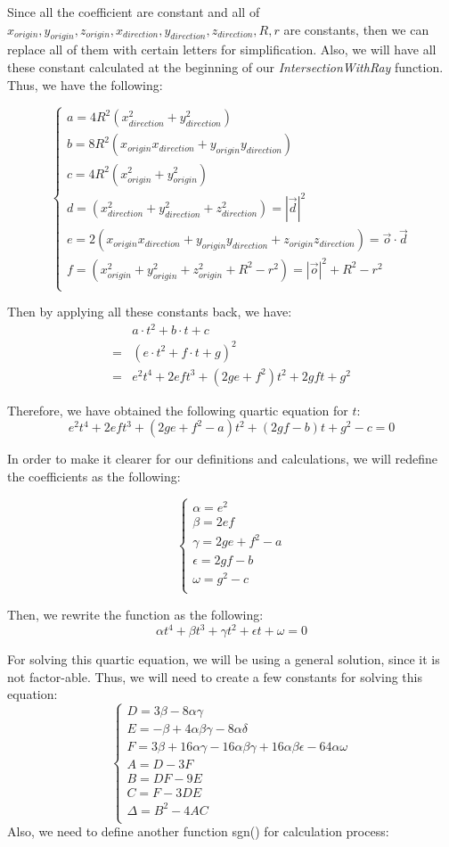 \documentclass[a4paper,12pt]{report}
\begin{document}
Since all the coefficient are constant and all of $x_{origin},y_{origin},z_{origin},x_{direction},y_{direction},z_{direction},R,r$ are constants, then we can replace all of them with certain letters for simplification. Also, we will have all these constant calculated at the beginning of our \textit{IntersectionWithRay} function. Thus, we have the following:

\[\begin{cases}
a=4R^2(x_{direction}^2+y_{direction}^2)\\
b=8R^2(x_{origin}x_{direction}+y_{origin}y_{direction})\\
c=4R^2(x_{origin}^2+y_{origin}^2)\\
d=(x_{direction}^2+y_{direction}^2+z_{direction}^2)=|\overrightarrow{d}|^2\\
e=2(x_{origin}x_{direction}+y_{origin}y_{direction}+z_{origin}z_{direction})=\overrightarrow{o}\cdot{\overrightarrow{d}}\\
f=(x_{origin}^2+y_{origin}^2+z_{origin}^2+R^2-r^2)=|\overrightarrow{o}|^2+R^2-r^2\\
\end{cases}\]

Then by applying all these constants back, we have: 
\begin{align*}
&a\cdot{t^2}+b\cdot{t}+c\\
=&(e\cdot{t^2}+f\cdot{t}+g)^2\\
=&e^2t^4+2eft^3+(2ge+f^2)t^2+2gft+g^2
\end{align*}

Therefore, we have obtained the following quartic equation for $t$:
\[e^2t^4+2eft^3+(2ge+f^2-a)t^2+(2gf-b)t+g^2-c=0\]

In order to make it clearer for our definitions and calculations, we will redefine the coefficients as the following:

\[\begin{cases}
\alpha=e^2\\
\beta=2ef\\
\gamma=2ge+f^2-a\\
\epsilon=2gf-b\\
\omega=g^2-c\\
\end{cases}\]

Then, we rewrite the function as the following:
\[\alpha t^4+\beta t^3 + \gamma t^2 + \epsilon t + \omega = 0\]

For solving this quartic equation, we will be using a general solution, since it is not factor-able. Thus, we will need to create a few constants for solving this equation:
\[\begin{cases}
D=3\beta-8\alpha \gamma\\
E=-\beta+4\alpha\beta\gamma-8\alpha\delta\\
F=3\beta+16\alpha\gamma-16\alpha\beta\gamma+16\alpha\beta\epsilon-64\alpha\omega\\
A=D-3F\\
B=DF-9E\\
C=F-3DE\\
\Delta = B^2-4AC\\
\end{cases}\]
Also, we need to define another function sgn() for calculation process:
\end{document}
